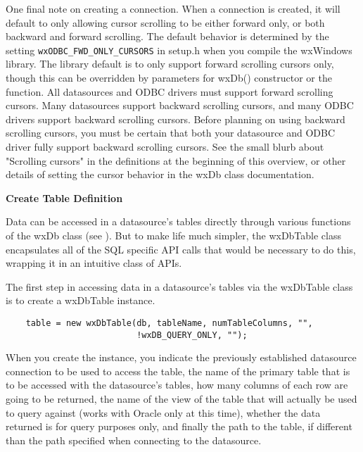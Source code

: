 One final note on creating a connection. When a connection is created, it 
will default to only allowing cursor scrolling to be either forward only, 
or both backward and forward scrolling. The default behavior is 
determined by the setting {\tt wxODBC\_FWD\_ONLY\_CURSORS} in setup.h when you 
compile the wxWindows library. The library default is to only support 
forward scrolling cursors only, though this can be overridden by parameters 
for wxDb() constructor or the  
function. All datasources and ODBC drivers must support forward scrolling 
cursors. Many datasources support backward scrolling cursors, and many 
ODBC drivers support backward scrolling cursors. Before planning on using 
backward scrolling cursors, you must be certain that both your datasource 
and ODBC driver fully support backward scrolling cursors. See the small 
blurb about "Scrolling cursors" in the definitions at the beginning of 
this overview, or other details of setting the cursor behavior in the wxDb 
class documentation.

{\bf Create Table Definition}

Data can be accessed in a datasource's tables directly through various 
functions of the wxDb class (see ). But to make life much 
simpler, the wxDbTable class encapsulates all of the SQL specific API calls 
that would be necessary to do this, wrapping it in an intuitive class of APIs.

The first step in accessing data in a datasource's tables via the wxDbTable 
class is to create a wxDbTable instance.

\begin{verbatim}
    table = new wxDbTable(db, tableName, numTableColumns, "", 
                          !wxDB_QUERY_ONLY, "");
\end{verbatim}

When you create the instance, you indicate the previously established 
datasource connection to be used to access the table, the name of the 
primary table that is to be accessed with the datasource's tables, how many 
columns of each row are going to be returned, the name of the view of the 
table that will actually be used to query against (works with Oracle only 
at this time), whether the data returned is for query purposes only, and 
finally the path to the table, if different than the path specified when 
connecting to the datasource.


